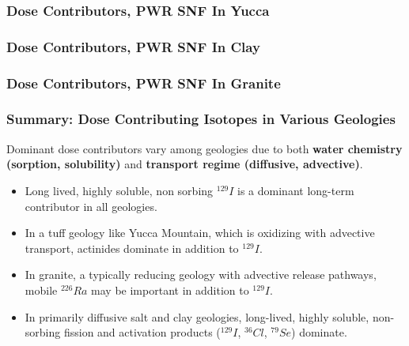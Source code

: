 
\begin{frame}
  \frametitle{Dose Contributors, PWR SNF In Yucca}
\footnotesize{
  
}
\end{frame}

\begin{frame}
  \frametitle{Dose Contributors, PWR SNF In Clay}
\footnotesize{
  
}
\end{frame}

\begin{frame}
  \frametitle{Dose Contributors, PWR SNF In Granite}
\footnotesize{
  
}
\end{frame}

\begin{frame}
  \frametitle{Summary: Dose Contributing Isotopes in Various Geologies}
Dominant dose contributors vary among geologies due to both \textbf{water chemistry (sorption, solubility)} and \textbf{transport regime (diffusive, advective)}. 
\begin{itemize}
  \item Long lived, highly soluble, non sorbing $^{129}I$ is a dominant long-term
contributor in all geologies.
  \item In a tuff geology like Yucca Mountain, which is oxidizing with advective transport, actinides dominate in addition to $^{129}I$.
  \item In granite, a typically reducing geology with advective release pathways, mobile $^{226}Ra$ may be important in addition to $^{129}I$.
  \item In primarily diffusive salt and clay geologies, long-lived, highly soluble, non-sorbing fission and activation products ($^{129}I$, $^{36}Cl$, $^{79}Se$)  dominate. 
\end{itemize}
\end{frame}
